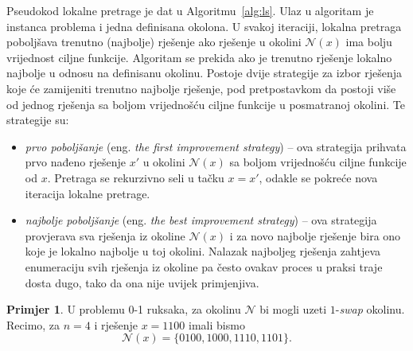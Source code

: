 \documentclass[a4paper, utf8, 11pt, colorlinks]{book}
\theoremstyle{definition}
\newtheorem{primjer}{Primjer}[chapter]
\begin{document}
Pseudokod lokalne pretrage je dat u Algoritmu~\ref{alg:ls}. Ulaz u algoritam je instanca problema i jedna definisana okolona. U svakoj iteraciji, lokalna pretraga poboljšava trenutno (najbolje) rješenje ako    rješenje u okolini  $\mathcal{N}(x)$ ima bolju vrijednost ciljne funkcije. Algoritam se prekida ako je trenutno rješenje lokalno najbolje u odnosu na definisanu okolinu.
 Postoje dvije strategije za izbor rješenja koje će zamijeniti trenutno najbolje rješenje, pod pretpostavkom da postoji više od jednog rješenja sa boljom vrijednošću ciljne funkcije u posmatranoj okolini. Te strategije su:
 \begin{itemize}
 	\item \emph{prvo poboljšanje} (eng. \emph{the first improvement strategy}) -- ova strategija prihvata prvo nađeno rješenje $x'$ u okolini $\mathcal{N}(x)$ sa boljom vrijednošću ciljne funkcije od $x$. Pretraga se rekurzivno seli u tačku  $x = x'$, odakle se pokreće nova iteracija lokalne pretrage.
 	\item \emph{najbolje poboljšanje} (eng. \emph{the best improvement strategy}) --   ova strategija provjerava sva rješenja iz okoline $\mathcal{N}(x)$ i za novo najbolje rješenje bira ono koje je lokalno najbolje u toj okolini. Nalazak  najboljeg rješenja zahtjeva enumeraciju svih rješenja iz okoline pa često ovakav proces u praksi traje dosta dugo,  tako da ona nije uvijek primjenjiva. %
 \end{itemize}
  
 \begin{primjer} U   problemu 0-1 ruksaka, za okolinu $\mathcal{N}$ bi mogli uzeti $1$-\emph{swap} okolinu. Recimo, za $n=4$ i rješenje $x=1100$ imali  bismo $$\mathcal{N}(x)= \{ 0100, 1000, 1110, 1101 \}.$$ 
 	\end{primjer}
  
\end{document}
